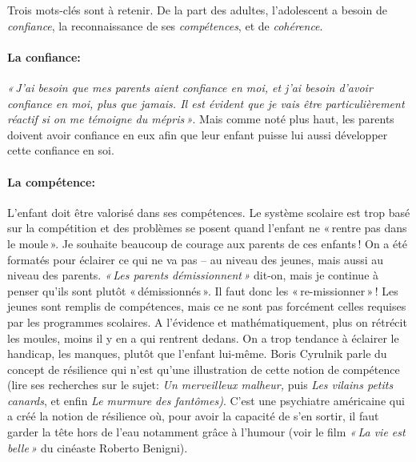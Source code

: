 \documentclass[11pt]{article} %
\begin{document}
  Trois mots-clés sont à retenir. De la part des adultes, l'adolescent a besoin de \emph{confiance}, la reconnaissance de ses \emph{compétences}, et de \emph{cohérence}.

  \paragraph{La confiance:} \textit{« J'ai besoin que mes parents aient confiance en moi, et j'ai besoin d'avoir confiance en moi, plus que jamais. Il est évident que je vais être particulièrement réactif si on me témoigne du mépris »}. Mais comme noté plus haut, les parents doivent avoir confiance en eux afin que leur enfant puisse lui aussi développer cette confiance en soi.

  \paragraph{La compétence:}  L'enfant doit être valorisé dans ses compétences. Le système scolaire est trop basé sur la compétition et des problèmes se posent quand l'enfant ne « rentre pas dans le moule ». Je souhaite beaucoup de courage aux parents de ces enfants ! On a été formatés pour éclairer ce qui ne va pas -- au niveau des jeunes, mais aussi au niveau des parents. \textit{« Les parents démissionnent »} dit-on, mais je continue à penser qu'ils sont plutôt « démissionnés ». Il faut donc les « re-missionner » !\newline
  Les jeunes sont remplis de compétences, mais ce ne sont pas forcément celles requises par les programmes scolaires. A l'évidence et mathématiquement, plus on rétrécit les moules, moins il y en a qui rentrent dedans.\newline
  On a trop tendance à éclairer le handicap, les manques, plutôt que l'enfant lui-même. Boris Cyrulnik parle du concept de résilience qui n'est qu'une illustration de cette notion de compétence (lire ses recherches sur le sujet: \textit{Un merveilleux malheur, } puis \textit{Les vilains petits canards}, et enfin \textit{Le murmure des fantômes)}. C'est une psychiatre américaine qui a créé la notion de résilience où, pour avoir la capacité de s'en sortir, il faut garder la tête hors de l'eau notamment grâce à l'humour (voir le film \textit{« La vie est belle »} du cinéaste Roberto Benigni).
\end{document}
